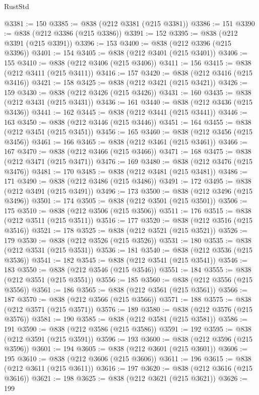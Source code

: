 \begin{lexlean}{RustStd}
\begin{coremodule}
{\begin{coremodule}
{{{{{{{{{{{{{{{{{{{{{{{{{{{{{{{{{{{{{{{{{{{{{{{{{{{{{{{@3381 := 150
@3385 := @838 (@212 @3381 (@215 @3381))
@3386 := 151
@3390 := @838 (@212 @3386 (@215 @3386))
@3391 := 152
@3395 := @838 (@212 @3391 (@215 @3391))
@3396 := 153
@3400 := @838 (@212 @3396 (@215 @3396))
@3401 := 154
@3405 := @838 (@212 @3401 (@215 @3401))
@3406 := 155
@3410 := @838 (@212 @3406 (@215 @3406))
@3411 := 156
@3415 := @838 (@212 @3411 (@215 @3411))
@3416 := 157
@3420 := @838 (@212 @3416 (@215 @3416))
@3421 := 158
@3425 := @838 (@212 @3421 (@215 @3421))
@3426 := 159
@3430 := @838 (@212 @3426 (@215 @3426))
@3431 := 160
@3435 := @838 (@212 @3431 (@215 @3431))
@3436 := 161
@3440 := @838 (@212 @3436 (@215 @3436))
@3441 := 162
@3445 := @838 (@212 @3441 (@215 @3441))
@3446 := 163
@3450 := @838 (@212 @3446 (@215 @3446))
@3451 := 164
@3455 := @838 (@212 @3451 (@215 @3451))
@3456 := 165
@3460 := @838 (@212 @3456 (@215 @3456))
@3461 := 166
@3465 := @838 (@212 @3461 (@215 @3461))
@3466 := 167
@3470 := @838 (@212 @3466 (@215 @3466))
@3471 := 168
@3475 := @838 (@212 @3471 (@215 @3471))
@3476 := 169
@3480 := @838 (@212 @3476 (@215 @3476))
@3481 := 170
@3485 := @838 (@212 @3481 (@215 @3481))
@3486 := 171
@3490 := @838 (@212 @3486 (@215 @3486))
@3491 := 172
@3495 := @838 (@212 @3491 (@215 @3491))
@3496 := 173
@3500 := @838 (@212 @3496 (@215 @3496))
@3501 := 174
@3505 := @838 (@212 @3501 (@215 @3501))
@3506 := 175
@3510 := @838 (@212 @3506 (@215 @3506))
@3511 := 176
@3515 := @838 (@212 @3511 (@215 @3511))
@3516 := 177
@3520 := @838 (@212 @3516 (@215 @3516))
@3521 := 178
@3525 := @838 (@212 @3521 (@215 @3521))
@3526 := 179
@3530 := @838 (@212 @3526 (@215 @3526))
@3531 := 180
@3535 := @838 (@212 @3531 (@215 @3531))
@3536 := 181
@3540 := @838 (@212 @3536 (@215 @3536))
@3541 := 182
@3545 := @838 (@212 @3541 (@215 @3541))
@3546 := 183
@3550 := @838 (@212 @3546 (@215 @3546))
@3551 := 184
@3555 := @838 (@212 @3551 (@215 @3551))
@3556 := 185
@3560 := @838 (@212 @3556 (@215 @3556))
@3561 := 186
@3565 := @838 (@212 @3561 (@215 @3561))
@3566 := 187
@3570 := @838 (@212 @3566 (@215 @3566))
@3571 := 188
@3575 := @838 (@212 @3571 (@215 @3571))
@3576 := 189
@3580 := @838 (@212 @3576 (@215 @3576))
@3581 := 190
@3585 := @838 (@212 @3581 (@215 @3581))
@3586 := 191
@3590 := @838 (@212 @3586 (@215 @3586))
@3591 := 192
@3595 := @838 (@212 @3591 (@215 @3591))
@3596 := 193
@3600 := @838 (@212 @3596 (@215 @3596))
@3601 := 194
@3605 := @838 (@212 @3601 (@215 @3601))
@3606 := 195
@3610 := @838 (@212 @3606 (@215 @3606))
@3611 := 196
@3615 := @838 (@212 @3611 (@215 @3611))
@3616 := 197
@3620 := @838 (@212 @3616 (@215 @3616))
@3621 := 198
@3625 := @838 (@212 @3621 (@215 @3621))
@3626 := 199
}}}}}}}}}}}}}}}}}}}}}}}}}}}}}}}}}}}}}}}}}}}}}}}}}}}}}}}
\end{coremodule}}
\end{coremodule}
\end{lexlean}
